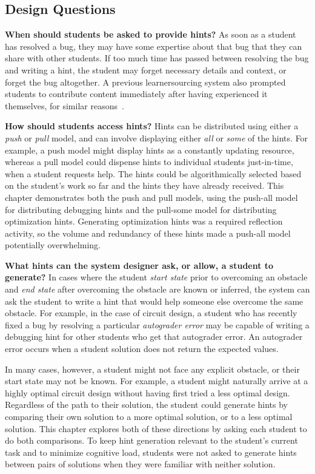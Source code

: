 \subsection{Design Questions} 

{\bf When should students be asked to provide hints?} As soon as a student has resolved a bug, they may have some expertise about that bug that they can share with other students. If too much time has passed between resolving the bug and writing a hint, the student may forget necessary details and context, or forget the bug altogether. A previous learnersourcing system also prompted students to contribute content immediately after having experienced it themselves, for similar reasons~\cite{weir2015}.

{\bf How should students access hints?} Hints can be distributed using either a \textit{push} or \textit{pull} model, and can involve displaying either \textit{all} or \textit{some} of the hints. For example, a push model might display hints as a constantly updating resource, whereas a pull model could dispense hints to individual students just-in-time, when a student requests help. The hints could be algorithmically selected based on the student's work so far and the hints they have already received. This chapter demonstrates both the push and pull models, using the push-all model for distributing debugging hints and the pull-some model for distributing optimization hints. Generating optimization hints was a required reflection activity, so the volume and redundancy of these hints made a push-all model potentially overwhelming.

{\bf What hints can the system designer ask, or allow, a student to generate?} In cases where the student \textit{start state} prior to overcoming an obstacle and \textit{end state} after overcoming the obstacle are known or inferred, the system can ask the student to write a hint that would help someone else overcome the same obstacle. For example, in the case of circuit design, a student who has recently fixed a bug by resolving a particular {\it autograder error} may be capable of writing a debugging hint for other students who get that autograder error. An autograder error occurs when a student solution does not return the expected values. 

In many cases, however, a student might not face any explicit obstacle, or their start state may not be known. For example, a student might naturally arrive at a highly optimal circuit design without having first tried a less optimal design. Regardless of the path to their solution, the student could generate hints by comparing their own solution to a more optimal solution, or to a less optimal solution. This chapter explores both of these directions by asking each student to do both comparisons. To keep hint generation relevant to the student's current task and to minimize cognitive load, students were not asked to generate hints between pairs of solutions when they were familiar with neither solution.

